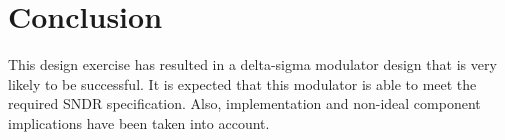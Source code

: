 \section{Conclusion}
\label{Conclusion}
This design exercise has resulted in a delta-sigma modulator design that is very likely to be successful.
It is expected that this modulator is able to meet the required SNDR specification.
Also, implementation and non-ideal component implications have been taken into account.

